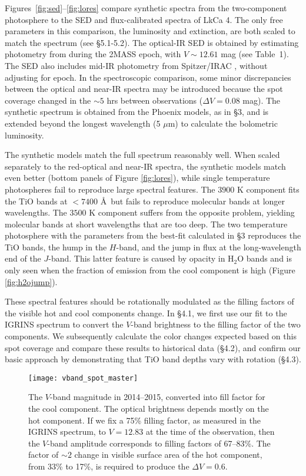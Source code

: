 \documentclass[twocolumn]{emulateapj}%
\begin{document}
Figures~\ref{fig:sed}--\ref{fig:lores} compare synthetic spectra from the two-component photosphere to the SED and flux-calibrated spectra of LkCa 4.  The only free parameters in this comparison, the luminosity and extinction, are both scaled to match the spectrum (see \S 5.1-5.2).  The optical-IR SED is obtained by estimating photometry from \citet{grankin08} during the 2MASS epoch, with $V\sim12.61$ mag (see Table~1).  The SED also includes mid-IR photometry from Spitzer/IRAC \citep{hartmann05}, without adjusting for epoch.  In the spectroscopic comparison, some minor discrepancies between the optical and near-IR spectra may be introduced because the spot coverage changed in the $\sim 5$ hrs between observations ($\Delta V=0.08$ mag).  The synthetic spectrum is obtained from the Phoenix models, as in \S 3, and is extended beyond the longest wavelength (5 $\mu$m) to calculate the bolometric luminosity.

The synthetic models match the full spectrum reasonably well.  When scaled separately to the red-optical and near-IR spectra, the synthetic models match even better (bottom panels of Figure \ref{fig:lores}), while single temperature photospheres fail to reproduce large spectral features.   The $3900$ K component fits the TiO bands at $<7400$ \AA\ but fails to reproduce molecular bands at longer wavelengths.  The $3500$ K component suffers from the opposite problem, yielding molecular bands at short wavelengths that are too deep.  The two temperature photosphere with the parameters from the best-fit calculated in \S 3 reproduces the TiO bands, the hump in the $H$-band, and the jump in flux at the long-wavelength end of the $J$-band.  This latter feature is caused by opacity in H$_2$O bands and is only seen when the fraction of emission from the cool component is high (Figure \ref{fig:h2ojump}).

These spectral features should be rotationally modulated as the filling factors of the visible hot and cool components change.    In \S 4.1, we first use our fit to the IGRINS spectrum to convert the $V$-band brightness to the filling factor of the two components.  We subsequently calculate the color changes expected based on this spot coverage and compare these results to historical data (\S 4.2), and confirm our basic approach by demonstrating that TiO band depths vary with rotation (\S 4.3).



\begin{figure*}
 \centering
 \texttt{[image: vband\_spot\_master]}
\caption{The $V$-band magnitude in 2014--2015, converted into fill factor for the cool component.  The optical brightness depends mostly on the hot component.  If we fix a 75\% filling factor, as measured in the IGRINS spectrum, to $V=12.83$ at the time of the observation, then the $V$-band amplitude  corresponds to filling factors of 67--83\%.  The factor of $\sim 2$ change in visible surface area of the hot component, from 33\% to 17\%, is required to produce the $\Delta V=0.6$. }
\label{fig:vband_spot}
\end{figure*}
\end{document}
